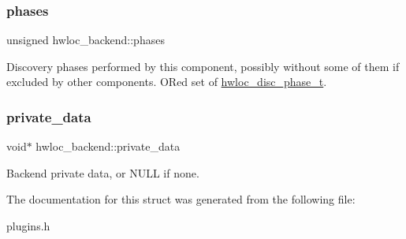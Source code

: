 \mbox{\label{a00374_aeca769840a6ff03e96462a9533adbccd}} 
\subsubsection{\texorpdfstring{phases}{phases}}
{\footnotesize\ttfamily unsigned hwloc\+\_\+backend\+::phases}



Discovery phases performed by this component, possibly without some of them if excluded by other components. OR\textquotesingle{}ed set of \hyperlink{a00228_ga3beef9f01f1c08c5700aec066fcec025}{hwloc\+\_\+disc\+\_\+phase\+\_\+t}. 

\mbox{\label{a00374_a2ea5bd36b7f06efdb65b98b32af16c68}} 
\subsubsection{\texorpdfstring{private\+\_\+data}{private\_data}}
{\footnotesize\ttfamily void$\ast$ hwloc\+\_\+backend\+::private\+\_\+data}



Backend private data, or N\+U\+LL if none. 



The documentation for this struct was generated from the following file\+:\begin{DoxyCompactItemize}
\item 
plugins.\+h\end{DoxyCompactItemize}
